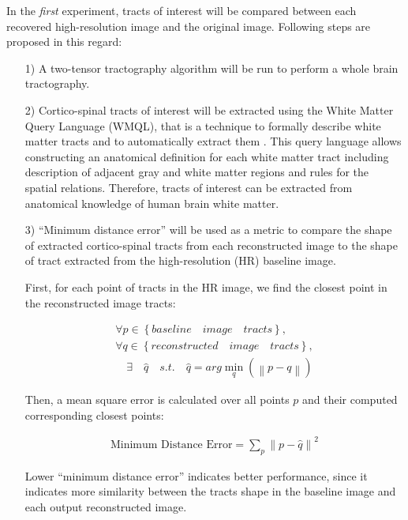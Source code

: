 In the \textit{first} experiment, tracts of interest will be compared between each recovered high-resolution image and the original image. Following steps are proposed in this regard:
\begin{itemize}
\item[1)] A two-tensor tractography algorithm \cite{Malcolm2010, baumgartner2012} will be run to perform a whole brain tractography.

\item[2)] Cortico-spinal tracts of interest will be extracted using the White Matter Query Language (WMQL), that is a technique to formally describe white matter tracts and to automatically extract them \cite{wassermann2013}.
This query language allows constructing an anatomical definition for each white matter tract including description of adjacent gray and white matter regions and rules for the spatial relations. Therefore, tracts of interest can be extracted from anatomical knowledge of human brain white matter.

\item[3)] ``Minimum distance error'' will be used as a metric to compare the shape of extracted cortico-spinal tracts from each reconstructed image to the shape of tract extracted from the high-resolution (HR) baseline image.

First, for each point of tracts in the HR image, we find the closest point in the reconstructed image tracts:

\begin{equation}
\begin{gathered}
\forall p\in \left\{baseline \quad image \quad tracts \right\}, \\
\forall q\in \left\{reconstructed \quad image \quad tracts \right\}, \\
\quad \exists \quad \hat{q} \quad s.t. \quad
\hat{q} = arg\min_q(\left \| p - q \right \|)
\end{gathered}
\end{equation}

Then, a mean square error is calculated over all points $p$ and their computed corresponding closest points:

\begin{equation}
\label{eq:minDist}
\begin{gathered}
\text{Minimum Distance Error} = \sum_{p} \left \| p - \hat{q} \right \|^2
\end{gathered}
\end{equation}

Lower ``minimum distance error'' indicates better performance, since it indicates more similarity between the tracts shape in the baseline image and each output reconstructed image.

\end{itemize}

